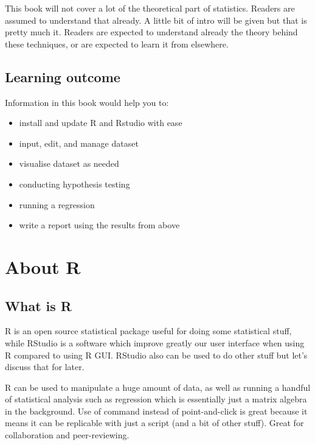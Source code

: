 \documentclass[
]{book}
\providecommand{\tightlist}{%
  \setlength{\itemsep}{0pt}\setlength{\parskip}{0pt}}
\begin{document}
This book will not cover a lot of the theoretical part of statistics. Readers are assumed to understand that already. A little bit of intro will be given but that is pretty much it. Readers are expected to understand already the theory behind these techniques, or are expected to learn it from elsewhere.

\hypertarget{learning-outcome}{%
\subsection{Learning outcome}\label{learning-outcome}}

Information in this book would help you to:

\begin{itemize}
\tightlist
\item
  install and update R and Rstudio with ease
\item
  input, edit, and manage dataset
\item
  visualise dataset as needed
\item
  conducting hypothesis testing
\item
  running a regression
\item
  write a report using the results from above
\end{itemize}

\hypertarget{about-r}{%
\section{About R}\label{about-r}}

\hypertarget{what-is-r}{%
\subsection{What is R}\label{what-is-r}}

R is an open source statistical package useful for doing some statistical stuff, while RStudio is a software which improve greatly our user interface when using R compared to using R GUI. RStudio also can be used to do other stuff but let's discuss that for later.

R can be used to manipulate a huge amount of data, as well as running a handful of statistical analysis such as regression which is essentially just a matrix algebra in the background. Use of command instead of point-and-click is great because it means it can be replicable with just a script (and a bit of other stuff). Great for collaboration and peer-reviewing.
\end{document}

